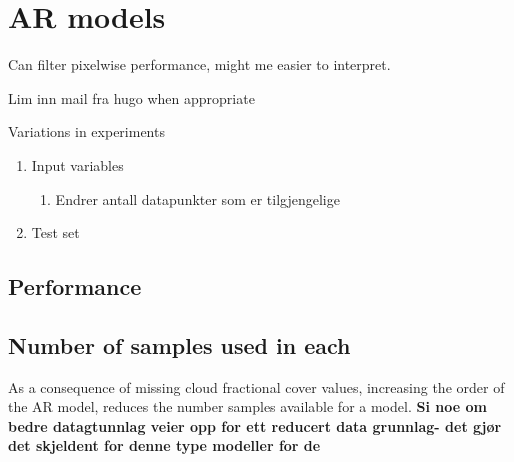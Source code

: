 
\section{AR models}
Can filter pixelwise performance, might me easier to interpret.

Lim inn mail fra hugo when appropriate

Variations in experiments 
\begin{enumerate}
    \item Input variables
    \begin{enumerate}
        \item Endrer antall datapunkter som er tilgjengelige
    \end{enumerate}
    \item Test set
\end{enumerate}

\subsection{Performance}



\subsection{Number of samples used in each}
As a consequence of missing cloud fractional cover values, increasing the order of the AR model, reduces the number samples available for a model. \textbf{Si noe om bedre datagtunnlag veier opp for ett reducert data grunnlag- det gjør det skjeldent for denne type modeller for de }



